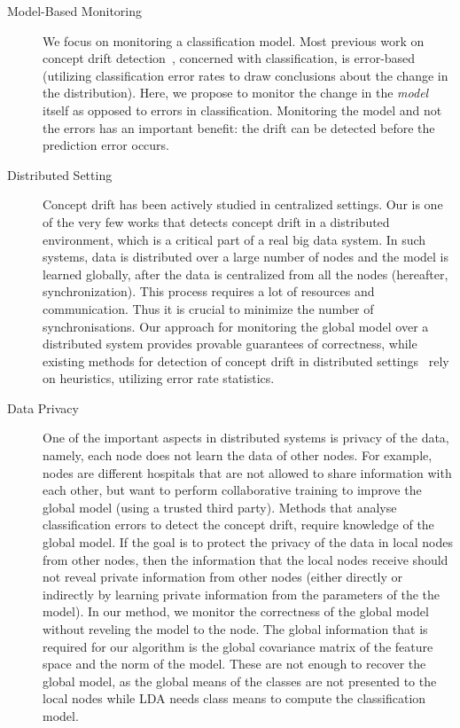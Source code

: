 \documentclass{sig-alternate-05-2015}
\begin{document}
\begin{description}
\item[Model-Based Monitoring] We focus on monitoring a classification model. 
Most previous work on concept drift detection~\cite{baena2006early,gama2004learning,Nishida2007}, 
concerned with classification, is error-based  (utilizing classification error rates to 
draw conclusions about the change in the distribution). 
Here, we propose to monitor the change in the {\em model} itself as opposed to errors in classification.  
Monitoring the model and not the errors has an important benefit: the drift can
be detected before the prediction error occurs.

\item[Distributed Setting]
    Concept drift has been actively studied in centralized settings. 
    Our is one of the very few works \cite{AngGZPH13} that detects concept drift in a distributed 
    environment, which is a critical part of a real big data system.
    In such systems, data is distributed over a large number of nodes and the model is learned 
    globally, after the data is centralized from all the nodes (hereafter, synchronization). 
    This process requires a lot of resources and communication. 
    Thus it is crucial to minimize the number of synchronisations. 
    Our approach for monitoring the global model over a distributed system  
    provides provable guarantees of correctness, while existing methods for detection of concept 
    drift in distributed settings~\cite{AngGZPH13} rely on heuristics, utilizing error rate statistics.

\item[Data Privacy] 
    One of the important aspects in distributed systems is privacy of the data, namely, each node does not learn the data of other nodes. For example, nodes are different hospitals that are not allowed to share information with each other, but want to perform collaborative training to improve the global model (using a trusted third party). Methods that analyse classification errors to detect the concept drift, require knowledge of the global model. If the goal is to protect the privacy of the data in local nodes from other nodes, then the information that the local nodes receive should not reveal private information from other nodes (either directly or indirectly by learning private information from the parameters of the the model). In our method, we monitor the correctness of the global model without reveling the model to the node. The global information that is required for our algorithm is the global covariance matrix of the feature space and the norm of the model. These are not enough to recover the global model, as the global means of the classes are not presented to the local nodes while LDA needs class means to compute the classification model.
\end{description}
\end{document}

